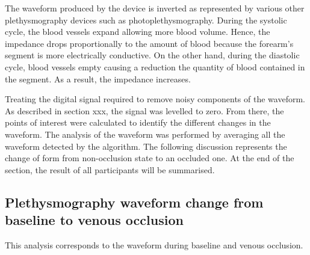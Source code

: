 The waveform produced by the device is inverted as represented by various other plethysmography devices such as photoplethysmography. During the systolic cycle, the blood vessels expand allowing more blood volume. Hence, the impedance drops proportionally to the amount of blood because the forearm's segment is more electrically conductive. On the other hand, during the diastolic cycle, blood vessels empty causing a reduction the quantity of blood contained in the segment. As a result, the impedance increases.  

Treating the digital signal required to remove noisy components of the waveform. As described in section xxx, the signal was levelled to zero.  From there, the points of interest were calculated to identify the different changes in the waveform. The analysis of the waveform was performed by averaging all the waveform detected by the algorithm. The following discussion represents the change of form from non-occlusion state to an occluded one. At the end of the section, the result of all participants will be summarised.

\subsection{Plethysmography waveform change from baseline to venous occlusion}
\label{section5.3.1}
This analysis corresponds to the waveform during baseline and venous occlusion.

